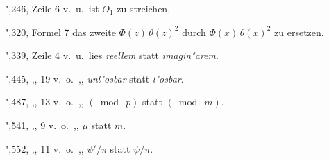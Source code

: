 \documentclass[12pt,a4paper]{article}
\begin{document}
\smallskip

\noindent\hspace*{2em}",\hspace{1.8em}246, Zeile 6 v.~u.\ ist $O_1$ zu streichen.

\smallskip

\noindent\hspace*{2em}",\hspace{1.8em}320, Formel 7 das zweite $\varPhi(z)\,\theta(z)^2$ durch $\varPhi(x)\,\theta(x)^2$ zu ersetzen.

\smallskip

\noindent\hspace*{2em}",\hspace{1.8em}339, Zeile 4 v.~u.\ lies \textit{reellem} statt \textit{imagin"arem}.

\smallskip

\noindent\hspace*{2em}",\hspace{1.8em}445, \hspace{2.5em},,\hspace{0.2em} \hspace{0.2em}19 v.~o.\ \hspace{0.5em},,\hspace{0.5em} \textit{unl"osbar} statt \textit{l"osbar}.

\smallskip

\noindent\hspace*{2em}",\hspace{1.8em}487, \hspace{2.5em},,\hspace{0.2em} \hspace{0.2em}13 v.~o.\ \hspace{0.5em},,\hspace{0.5em} $(\bmod\ p)$ statt $(\bmod\ m)$.

\smallskip

\noindent\hspace*{2em}",\hspace{1.8em}541, \hspace{2.5em},,\hspace{0.2em} \hspace{0.8em}9 v.~o.\ \hspace{0.5em},,\hspace{0.5em} $\mu$ statt $m$.

\smallskip

\noindent\hspace*{2em}",\hspace{1.8em}552, \hspace{2.5em},,\hspace{0.2em} \hspace{0.2em}11 v.~o.\ \hspace{0.5em},,\hspace{0.5em} $\psi'/\pi$ statt $\psi/\pi$.
\end{document}
